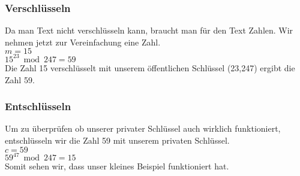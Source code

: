 \subsubsection{Verschlüsseln}
Da man Text nicht verschlüsseln kann, braucht man für den Text Zahlen. Wir nehmen jetzt zur Vereinfachung eine Zahl.\\
$ m = 15 $ \\
$ 15^{23} \bmod 247 = 59$ \\
Die Zahl 15 verschlüsselt mit unserem öffentlichen Schlüssel (23,247) ergibt die Zahl 59.
\subsubsection{Entschlüsseln}
Um zu überprüfen ob unserer privater Schlüssel auch wirklich funktioniert, entschlüsseln wir die Zahl 59 mit unserem privaten Schlüssel.\\
$ c = 59 $ \\
$ 59^{47} \bmod 247 = 15$ \\
Somit sehen wir, dass unser kleines Beispiel funktioniert hat.
